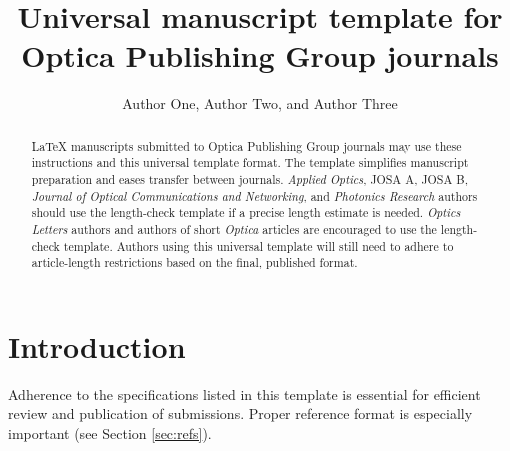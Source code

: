 \documentclass{optica-article}
\begin{document}
\title{Universal manuscript template for Optica Publishing Group journals}

\author{Author One, Author Two, and Author Three}

\address{Peer Review, Publications Department, Optica Publishing
	Group, 2010 Massachusetts Avenue NW, Washington, DC 20036, USA\\
	Publications Department, Optica Publishing Group, 2010
	Massachusetts Avenue NW, Washington, DC 20036, USA\\
	Currently with the Department of Electronic Journals, Optica
	Publishing Group, 2010 Massachusetts Avenue NW, Washington, DC 20036, USA}




\begin{abstract}
	\LaTeX{} manuscripts submitted to Optica Publishing Group journals may use
	these instructions and this universal template format. The template
	simplifies manuscript preparation and eases transfer between journals.
	\emph{Applied Optics}, JOSA A, JOSA B,
	\emph{Journal of Optical Communications and Networking}, and
	\emph{Photonics Research} authors should use the length-check template if
	a precise length estimate is needed. \emph{Optics Letters} authors and
	authors of short \emph{Optica} articles are encouraged to use the length-check template. Authors using this universal template will still need to adhere to article-length restrictions based on the final, published format.
\end{abstract}

\section{Introduction}
Adherence to the specifications listed in this template is essential for
efficient review and publication of submissions. Proper reference format is
especially important (see Section \ref{sec:refs}).
\end{document}
